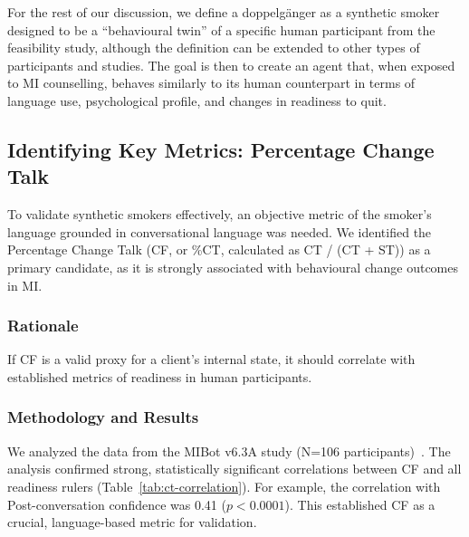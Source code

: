 For the rest of our discussion, we define a doppelgänger as a synthetic smoker designed to be a ``behavioural twin'' of a specific human participant from the feasibility study, although the definition can be extended to other types of participants and studies. The goal is then to create an agent that, when exposed to MI counselling, behaves similarly to its human counterpart in terms of language use, psychological profile, and changes in readiness to quit.



\subsection{Identifying Key Metrics: Percentage Change Talk}

To validate synthetic smokers effectively, an objective metric of the smoker's language grounded in conversational language was needed. We identified the Percentage Change Talk (CF, or \%CT, calculated as CT / (CT + ST)) as a primary candidate, as it is strongly associated with behavioural change outcomes in MI.

\subsubsection{Rationale}
If CF is a valid proxy for a client's internal state, it should correlate with established metrics of readiness in human participants.

\subsubsection{Methodology and Results}
We analyzed the data from the MIBot v6.3A study (N=106 participants)~\citep{mahmood-etal-2025-fully}. The analysis confirmed strong, statistically significant correlations between CF and all readiness rulers (Table~\ref{tab:ct-correlation}). For example, the correlation with Post-conversation confidence was 0.41 ($p < 0.0001$). This established CF as a crucial, language-based metric for validation.

